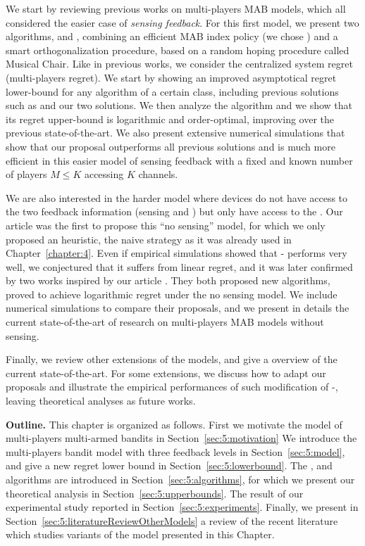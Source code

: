 We start by reviewing previous works on multi-players MAB models, which all considered the easier case of \emph{sensing feedback}.
%
For this first model, we present two algorithms, \RandTopM{} and \MCTopM, combining an efficient MAB index policy (we chose \klUCB) and a smart orthogonalization procedure, based on a random hoping procedure called Musical Chair.
Like in previous works, we consider the centralized system regret (multi-players regret).
We start by showing an improved asymptotical regret lower-bound for any algorithm of a certain class, including previous solutions such as \rhoRand{} and our two solutions.
We then analyze the \MCTopM{} algorithm and we show that its regret upper-bound is logarithmic and order-optimal, improving over the previous state-of-the-art.
We also present extensive numerical simulations that show that our proposal outperforms all previous solutions and is much more efficient in this easier model of sensing feedback with a fixed and known number of players $M \leq K$ accessing $K$ channels.

We are also interested in the harder model where devices do not have access to the two feedback information (sensing and \Ack) but only have access to the \Ack.
Our article \cite{Besson2018ALT} was the first to propose this ``no sensing'' model, for which we only proposed an heuristic, the naive \Selfish{} strategy as it was already used in Chapter~\ref{chapter:4}.
Even if empirical simulations showed that \Selfish-\klUCB{} performs very well, we conjectured that it suffers from linear regret, and it was later confirmed by two works inspired by our article \cite{LugosiMehrabian18,BoursierPerchet18}.
They both proposed new algorithms, proved to achieve logarithmic regret under the no sensing model.
We include numerical simulations to compare their proposals, and we present in details the current state-of-the-art of research on multi-players MAB models without sensing.

Finally, we review other extensions of the models, and give a overview of the current state-of-the-art.
For some extensions, we discuss how to adapt our proposals and illustrate the empirical performances of such modification of \MCTopM-\klUCB{}, leaving theoretical analyses as future works.


\textbf{Outline.}
%
This chapter is organized as follows.
First we motivate the model of multi-players multi-armed bandits in Section~\ref{sec:5:motivation}
We introduce the multi-players bandit model with three feedback levels in Section~\ref{sec:5:model}, and give a new regret lower bound in Section~\ref{sec:5:lowerbound}.
The \RandTopM, \MCTopM{} and \Selfish{} algorithms are introduced in Section~\ref{sec:5:algorithms},
for which we present our theoretical analysis in Section~\ref{sec:5:upperbounds}.
The result of our experimental study reported in Section~\ref{sec:5:experiments}.
Finally, we present in Section~\ref{sec:5:literatureReviewOtherModels} a review of the recent literature which studies variants of the model presented in this Chapter.


